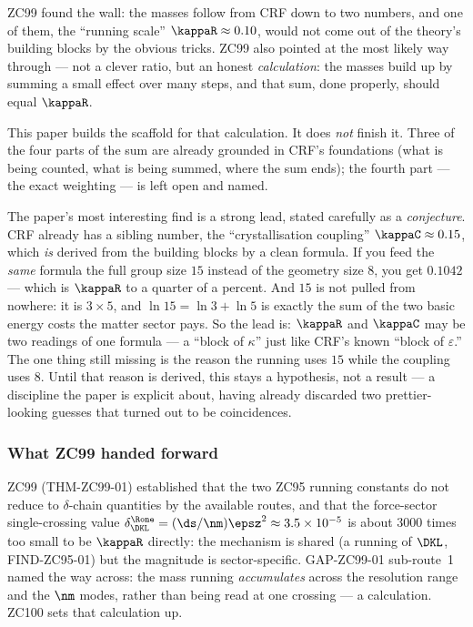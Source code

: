 \documentclass[12pt, a4paper]{article}
\begin{document}
\begin{keybox}[title={If you are just arriving --- ZC100 in plain language}]
\sloppy
ZC99 found the wall: the masses follow from CRF down to two numbers, and one of
them, the ``running scale'' $\kappaR\approx0.10$, would not come out of the
theory's building blocks by the obvious tricks. ZC99 also pointed at the most
likely way through --- not a clever ratio, but an honest \emph{calculation}:
the masses build up by summing a small effect over many steps, and that sum,
done properly, should equal $\kappaR$.

This paper builds the scaffold for that calculation. It does \emph{not} finish
it. Three of the four parts of the sum are already grounded in CRF's
foundations (what is being counted, what is being summed, where the sum ends);
the fourth part --- the exact weighting --- is left open and named.

The paper's most interesting find is a strong lead, stated carefully as a
\emph{conjecture}. CRF already has a sibling number, the ``crystallisation
coupling'' $\kappaC\approx0.15$, which \emph{is} derived from the building
blocks by a clean formula. If you feed the \emph{same} formula the full group
size $15$ instead of the geometry size $8$, you get $0.1042$ --- which is
$\kappaR$ to a quarter of a percent. And $15$ is not pulled from nowhere: it is
$3\times5$, and $\ln 15=\ln3+\ln5$ is exactly the sum of the two basic energy
costs the matter sector pays. So the lead is: $\kappaR$ and $\kappaC$ may be two
readings of one formula --- a ``block of $\kappa$'' just like CRF's known
``block of $\varepsilon$.'' The one thing still missing is the reason the
running uses $15$ while the coupling uses $8$. Until that reason is derived,
this stays a hypothesis, not a result --- a discipline the paper is explicit
about, having already discarded two prettier-looking guesses that turned out to
be coincidences.
\end{keybox}

\subsubsection{What ZC99 handed forward}

ZC99 (THM-ZC99-01) established that the two ZC95 running constants do not reduce
to $\delta$-chain quantities by the available routes, and that the force-sector
single-crossing value $\delta_{\DKL}^{\Rone}=(\ds/\nm)\epsz^2\approx3.5\times
10^{-5}$ is about $3000$ times too small to be $\kappaR$ directly: the mechanism
is shared (a running of $\DKL$, FIND-ZC95-01) but the magnitude is
sector-specific. GAP-ZC99-01 sub-route~1 named the way across: the mass running
\emph{accumulates} across the resolution range and the $\nm$ modes, rather than
being read at one crossing --- a calculation. ZC100 sets that calculation up.
\end{document}

